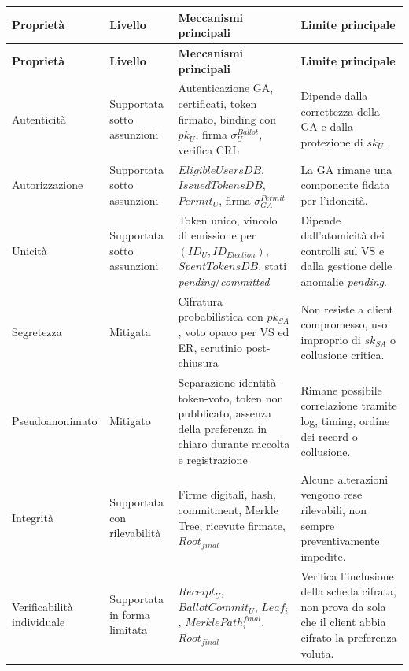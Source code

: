 \documentclass[a4paper,12pt]{article}
\begin{document}
\begin{longtable}{|>{\raggedright\arraybackslash}p{}|>{\raggedright\arraybackslash}p{}|>{\raggedright\arraybackslash}p{}|>{\raggedright\arraybackslash}p{}|}
    \hline
    \rowcolor{HeaderBlue}\textbf{Proprietà} & \textbf{Livello} & \textbf{Meccanismi principali} & \textbf{Limite principale} \\
    \hline
    \endfirsthead
    \hline
    \rowcolor{HeaderBlue}\textbf{Proprietà} & \textbf{Livello} & \textbf{Meccanismi principali} & \textbf{Limite principale} \\
    \hline
    \endhead
    Autenticità & Supportata sotto assunzioni & Autenticazione GA, certificati, token firmato, binding con \(pk_U\), firma \(\sigma_U^{Ballot}\), verifica CRL & Dipende dalla correttezza della GA e dalla protezione di \(sk_U\). \\
    \hline
    Autorizzazione & Supportata sotto assunzioni & \(EligibleUsersDB\), \(IssuedTokensDB\), \(Permit_U\), firma \(\sigma_{GA}^{Permit}\) & La GA rimane una componente fidata per l'idoneità. \\
    \hline
    Unicità & Supportata sotto assunzioni & Token unico, vincolo di emissione per \((ID_U,ID_{Election})\), \(SpentTokensDB\), stati \emph{pending}/\emph{committed} & Dipende dall'atomicità dei controlli sul VS e dalla gestione delle anomalie \emph{pending}. \\
    \hline
    Segretezza & Mitigata & Cifratura probabilistica con \(pk_{SA}\), voto opaco per VS ed ER, scrutinio post-chiusura & Non resiste a client compromesso, uso improprio di \(sk_{SA}\) o collusione critica. \\
    \hline
    Pseudoanonimato & Mitigato & Separazione identità-token-voto, token non pubblicato, assenza della preferenza in chiaro durante raccolta e registrazione & Rimane possibile correlazione tramite log, timing, ordine dei record o collusione. \\
    \hline
    Integrità & Supportata con rilevabilità & Firme digitali, hash, commitment, Merkle Tree, ricevute firmate, \(Root_{final}\) & Alcune alterazioni vengono rese rilevabili, non sempre preventivamente impedite. \\
    \hline
    Verificabilità individuale & Supportata in forma limitata & \(Receipt_U\), \(BallotCommit_U\), \(Leaf_i\), \(MerklePath_i^{final}\), \(Root_{final}\) & Verifica l'inclusione della scheda cifrata, non prova da sola che il client abbia cifrato la preferenza voluta. \\

\end{longtable}
\end{document}
